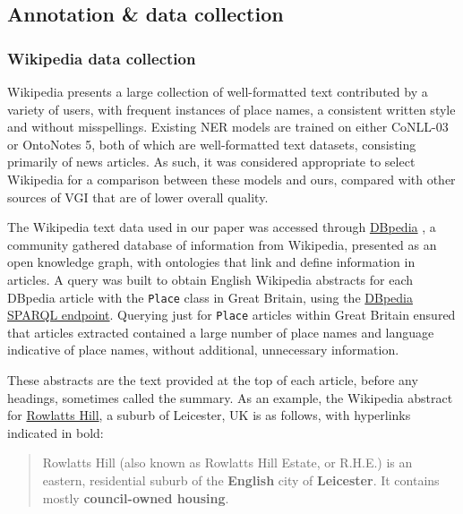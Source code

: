\documentclass[]{interact}
\theoremstyle{plain}%
\theoremstyle{definition}
\theoremstyle{remark}
\begin{document}
\hypertarget{annotation-data-collection}{%
\subsection{Annotation \& data
collection}\label{annotation-data-collection}}

\hypertarget{wikipedia-data-collection}{%
\subsubsection{Wikipedia data
collection}\label{wikipedia-data-collection}}

Wikipedia presents a large collection of well-formatted text contributed
by a variety of users, with frequent instances of place names, a
consistent written style and without misspellings. Existing NER models
are trained on either CoNLL-03 or OntoNotes 5, both of which are
well-formatted text datasets, consisting primarily of news articles. As
such, it was considered appropriate to select Wikipedia for a comparison
between these models and ours, compared with other sources of VGI that
are of lower overall quality.

The Wikipedia text data used in our paper was accessed through
\href{https://wiki.dbpedia.org/}{DBpedia} \citep{auer2007}, a community
gathered database of information from Wikipedia, presented as an open
knowledge graph, with ontologies that link and define information in
articles. A query was built to obtain English Wikipedia abstracts for
each DBpedia article with the \texttt{Place} class in Great Britain,
using the \href{http://dbpedia.org/sparql}{DBpedia SPARQL endpoint}.
Querying just for \texttt{Place} articles within Great Britain ensured
that articles extracted contained a large number of place names and
language indicative of place names, without additional, unnecessary
information.

These abstracts are the text provided at the top of each article, before
any headings, sometimes called the summary. As an example, the Wikipedia
abstract for \href{https://en.wikipedia.org/wiki/Rowlatts_Hill}{Rowlatts
Hill}, a suburb of Leicester, UK is as follows, with hyperlinks
indicated in bold:

\begin{quote}
Rowlatts Hill (also known as Rowlatts Hill Estate, or R.H.E.) is an
eastern, residential suburb of the \textbf{English} city of
\textbf{Leicester}. It contains mostly \textbf{council-owned housing}.
\end{quote}
\end{document}
